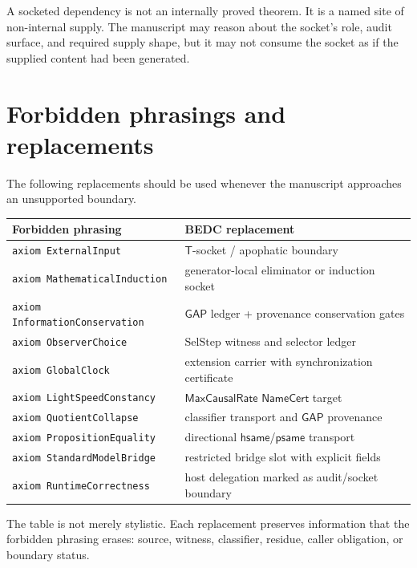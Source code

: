 \begin{corollary}
\label{cor:external-supply-socket-not-theorem}
A socketed dependency is not an internally proved theorem. It is a named site of non-internal supply. The manuscript may reason about the socket's role, audit surface, and required supply shape, but it may not consume the socket as if the supplied content had been generated.
\end{corollary}

\section{Forbidden phrasings and replacements}
\label{sec:external-supply-forbidden-phrasings}

The following replacements should be used whenever the manuscript approaches an unsupported boundary.

\begin{longtable}{p{}p{}}
\toprule
\textbf{Forbidden phrasing} & \textbf{BEDC replacement} \\
\midrule
\texttt{axiom ExternalInput} & $\mathsf{T}$-socket / apophatic boundary \\
\texttt{axiom MathematicalInduction} & generator-local eliminator or induction socket \\
\texttt{axiom InformationConservation} & $\mathsf{GAP}$ ledger + provenance conservation gates \\
\texttt{axiom ObserverChoice} & $\mathrm{SelStep}$ witness and selector ledger \\
\texttt{axiom GlobalClock} & extension carrier with synchronization certificate \\
\texttt{axiom LightSpeedConstancy} & $\mathsf{MaxCausalRate}$ $\mathsf{NameCert}$ target \\
\texttt{axiom QuotientCollapse} & classifier transport and $\mathsf{GAP}$ provenance \\
\texttt{axiom PropositionEquality} & directional $\mathsf{hsame}$/$\mathsf{psame}$ transport \\
\texttt{axiom StandardModelBridge} & restricted bridge slot with explicit fields \\
\texttt{axiom RuntimeCorrectness} & host delegation marked as audit/socket boundary \\
\bottomrule
\end{longtable}

The table is not merely stylistic. Each replacement preserves information that the forbidden phrasing erases: source, witness, classifier, residue, caller obligation, or boundary status.

